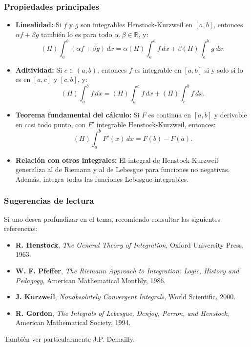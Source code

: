\documentclass[12pt, a4paper]{article}
\theoremstyle{rioplatense}
\begin{document}
\subsubsection{Propiedades principales}
\begin{itemize}
    \item \textbf{Linealidad:} Si $f$ y $g$ son integrables Henstock-Kurzweil en $[a,b]$, entonces $\alpha f + \beta g$ también lo es para todo $\alpha, \beta \in \mathbb{R}$, y:
    \[
    (H)\int_a^b (\alpha f + \beta g) \, dx = \alpha (H)\int_a^b f \, dx + \beta (H)\int_a^b g \, dx.
    \]

    \item \textbf{Aditividad:} Si $c \in (a,b)$, entonces $f$ es integrable en $[a,b]$ si y solo si lo es en $[a,c]$ y $[c,b]$, y:
    \[
    (H)\int_a^b f \, dx = (H)\int_a^c f \, dx + (H)\int_c^b f \, dx.
    \]

    \item \textbf{Teorema fundamental del cálculo:} Si $F$ es continua en $[a,b]$ y derivable en casi todo punto, con $F'$ integrable Henstock-Kurzweil, entonces:
    \[
    (H)\int_a^b F'(x) \, dx = F(b) - F(a).
    \]

    \item \textbf{Relación con otros integrales:} El integral de Henstock-Kurzweil generaliza al de Riemann y al de Lebesgue para funciones no negativas. Además, integra todas las funciones Lebesgue-integrables.
\end{itemize}

\subsubsection{Sugerencias de lectura}
Si uno desea profundizar en el tema, recomiendo consultar las siguientes referencias:
\begin{itemize}
    \item \textbf{R. Henstock}, \textit{The General Theory of Integration}, Oxford University Press, 1963.
    \item \textbf{W. F. Pfeffer}, \textit{The Riemann Approach to Integration: Logic, History and Pedagogy}, American Mathematical Monthly, 1986.
    \item \textbf{J. Kurzweil}, \textit{Nonabsolutely Convergent Integrals}, World Scientific, 2000.
    \item \textbf{R. Gordon}, \textit{The Integrals of Lebesgue, Denjoy, Perron, and Henstock}, American Mathematical Society, 1994.
\end{itemize} %
Tambi\'en ver particularmente J.P. Demailly.
\end{document}
